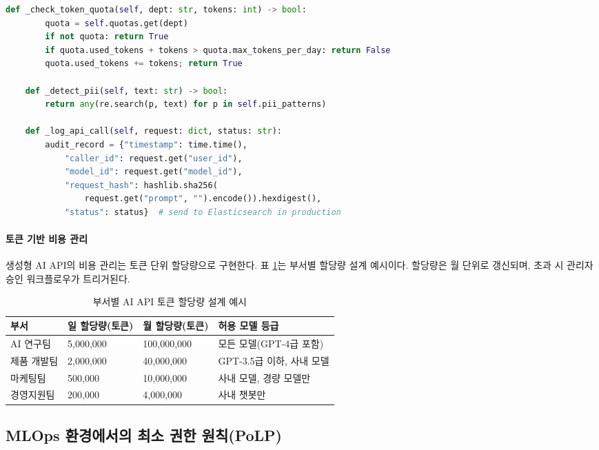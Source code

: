 \begin{lstlisting}[language=Python, caption={API Governance Middleware with Rate Limiting and Content Filtering}, label={lst:api_governance}]
    def _check_token_quota(self, dept: str, tokens: int) -> bool:
        quota = self.quotas.get(dept)
        if not quota: return True
        if quota.used_tokens + tokens > quota.max_tokens_per_day: return False
        quota.used_tokens += tokens; return True

    def _detect_pii(self, text: str) -> bool:
        return any(re.search(p, text) for p in self.pii_patterns)

    def _log_api_call(self, request: dict, status: str):
        audit_record = {"timestamp": time.time(),
            "caller_id": request.get("user_id"),
            "model_id": request.get("model_id"),
            "request_hash": hashlib.sha256(
                request.get("prompt", "").encode()).hexdigest(),
            "status": status}  # send to Elasticsearch in production
\end{lstlisting}

\paragraph{토큰 기반 비용 관리}

생성형 AI API의 비용 관리는 토큰 단위 할당량으로 구현한다. 표 \ref{tab:token_quota}는 부서별 할당량 설계 예시이다. 할당량은 월 단위로 갱신되며, 초과 시 관리자 승인 워크플로우가 트리거된다.

\begin{table}[htbp]
\centering
\caption{부서별 AI API 토큰 할당량 설계 예시}
\label{tab:token_quota}
\begin{tabularx}{\textwidth}{p{2.5cm}p{2.5cm}p{2.5cm}X}
\toprule
\textbf{부서} & \textbf{일 할당량(토큰)} & \textbf{월 할당량(토큰)} & \textbf{허용 모델 등급} \\
\midrule
AI 연구팀 & 5,000,000 & 100,000,000 & 모든 모델(GPT-4급 포함) \\
제품 개발팀 & 2,000,000 & 40,000,000 & GPT-3.5급 이하, 사내 모델 \\
마케팅팀 & 500,000 & 10,000,000 & 사내 모델, 경량 모델만 \\
경영지원팀 & 200,000 & 4,000,000 & 사내 챗봇만 \\
\bottomrule
\end{tabularx}
\end{table}

\subsection{MLOps 환경에서의 최소 권한 원칙(PoLP)}
\label{sec:15.3.3}

